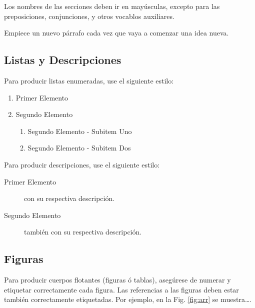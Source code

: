 \documentclass[a4paper,10pt,twocolumn]{article}
\begin{document}
		Los nombres de las secciones deben ir en mayúsculas, excepto para las
		preposiciones, conjunciones, y otros vocablos auxiliares.

		Empiece un nuevo párrafo cada vez que vaya a comenzar una idea nueva.

	\subsection{Listas y Descripciones}\label{sub:lists}
		Para producir listas enumeradas, use el siguiente estilo:

		\begin{enumerate}
			\item Primer Elemento
			\item Segundo Elemento
			\begin {enumerate}
				\item {Segundo Elemento - Subitem Uno}
				\item {Segundo Elemento - Subitem Dos}
			\end {enumerate}
		\end{enumerate}

		Para producir descripciones, use el siguiente estilo:

		\begin{description}
			\item [Primer Elemento] con su respectiva descripción.
			\item [Segundo Elemento] también con su respectiva descripción.
		\end{description}

	\subsection{Figuras}\label{sub:figures}
	

		Para producir cuerpos flotantes (figuras ó tablas), asegúrese de numerar
		y etiquetar correctamente cada figura. Las referencias a las figuras deben
		estar también correctamente etiquetadas. Por ejemplo, en la Fig. \ref{fig:arr}
		se muestra\ldots.
\end{document}
